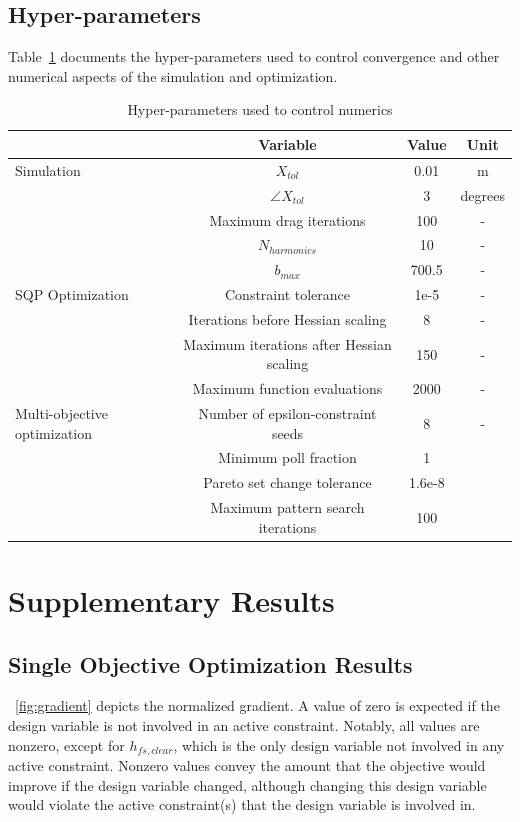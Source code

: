 \begin{appendices}
\subsection{Hyper-parameters}\label{sec:appendix-extra-param}
Table~\ref{tab:hyperparams} documents the hyper-parameters used to control convergence and other numerical aspects of the simulation and optimization.
\begin{table}
    \centering
    \begin{tabular}{|l|c|c|c|} \hline 
          &Variable&  Value& Unit\\ \hline 
          Simulation&$X_{tol}$&  0.01 & m \\ \hline 
          &$\angle X_{tol}$& 3 & degrees\\ \hline 
          &Maximum drag iterations& 100 & -\\ \hline 
          &$N_{harmonics}$& 10 & - \\ \hline
          &$b_{max}$ & 700.5 & - \\ \hline
          SQP Optimization&Constraint tolerance& 1e-5 & - \\ \hline
          &Iterations before Hessian scaling& 8 & - \\ \hline
  &Maximum iterations after Hessian scaling& 150&-\\\hline
  &Maximum function evaluations& 2000&-\\\hline
 Multi-objective optimization& Number of epsilon-constraint seeds& 8&-\\\hline
 & Minimum poll fraction& 1&\\\hline
 & Pareto set change tolerance& 1.6e-8&\\\hline
 & Maximum pattern search iterations& 100&\\\hline
    \end{tabular}
    \caption{Hyper-parameters used to control numerics}
    \label{tab:hyperparams}
\end{table}

\clearpage
\section{Supplementary Results}
\label{sec:appendix-supplemental-results}

\subsection{Single Objective Optimization Results}
\figureautorefname~\ref{fig:gradient} depicts the normalized gradient.
A value of zero is expected if the design variable is not involved in an active constraint.
Notably, all values are nonzero, except for $h_{fs,clear}$, which is the only design variable not involved in any active constraint.
Nonzero values convey the amount that the objective would improve if the design variable changed, although changing this design variable would violate the active constraint(s) that the design variable is involved in.


\end{appendices}
